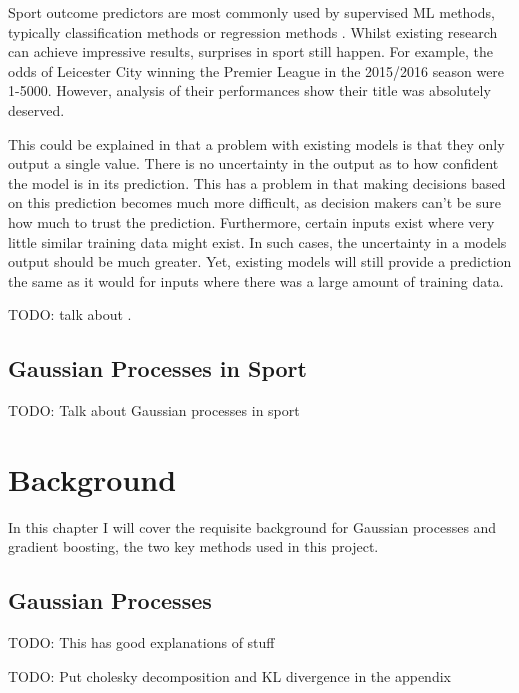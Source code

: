 \documentclass[12pt,a4paper]{report}
\theoremstyle{definition}
\begin{document}
Sport outcome predictors are most commonly used by supervised ML methods, typically classification methods or regression methods \citep{horvat2020}. 
Whilst existing research can achieve impressive results, surprises in sport still happen. For example, the odds of Leicester City winning the Premier League in the 2015/2016 season were 1-5000. 
However, analysis of their performances show their title was absolutely deserved.

This could be explained in that a problem with existing models is that they only output a single value. 
There is no uncertainty in the output as to how confident the model is in its prediction. 
This has a problem in that making decisions based on this prediction becomes much more difficult, as decision makers can't be sure how much to trust the prediction. 
Furthermore, certain inputs exist where very little similar training data might exist. 
In such cases, the uncertainty in a models output should be much greater. 
Yet, existing models will still provide a prediction the same as it would for inputs where there was a large amount of training data.

 TODO: talk about \citep{Blumberg2020}.

\section{Gaussian Processes in Sport}

TODO: Talk about Gaussian processes in sport

\chapter{Background}

In this chapter I will cover the requisite background for Gaussian processes and gradient boosting, the two key methods used in this project.

\section{Gaussian Processes}

\citep{Griffiths2023}

\citep{RasmussenWilliams2006}

\citep{Kaiser2017}

\citep{Yi2019} TODO: This has good explanations of stuff

TODO: Put cholesky decomposition and KL divergence in the appendix
\end{document}
